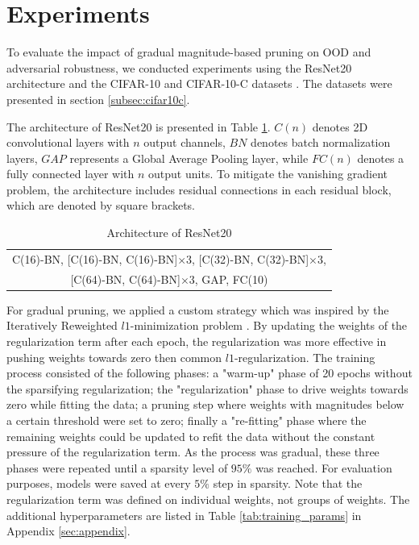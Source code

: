 \section{Experiments}\label{sec:exp}

To evaluate the impact of gradual magnitude-based pruning on OOD and adversarial robustness, we conducted experiments using the
ResNet20 architecture and the CIFAR-10 and CIFAR-10-C datasets \cite{resnet}. The datasets were presented in section \ref{subsec:cifar10c}.

The architecture of ResNet20 is presented in Table \ref{tab:resnet20}. $C(n)$ denotes 2D convolutional layers with $n$ output channels, $BN$ denotes
batch normalization layers, $GAP$ represents a Global Average Pooling layer, while $FC(n)$ denotes a fully connected layer with $n$ output units. 
To mitigate the vanishing gradient problem, the architecture includes residual connections in each residual block, which are denoted by square brackets.

\begin{table}[H]
\centering
\begin{tabular}{|c|}
    \hline
    C(16)-BN, [C(16)-BN, C(16)-BN]$\times3$, [C(32)-BN, C(32)-BN]$\times3$, \\ {}
    [C(64)-BN, C(64)-BN]$\times3$, GAP, FC(10) \\ \hline
\end{tabular}
\caption{Architecture of ResNet20}
\label{tab:resnet20}
\end{table}

For gradual pruning, we applied a custom strategy which was inspired by the Iteratively Reweighted $l1$-minimization problem \cite{boyd}. By updating 
the weights of the regularization term after each epoch, the regularization was more effective in pushing weights towards zero then common 
$l1$-regularization. The training process consisted of the following phases: a "warm-up" phase of 20 epochs without the sparsifying regularization; 
the "regularization" phase to drive weights towards zero while fitting the data; a pruning step where weights with magnitudes below a certain threshold
were set to zero; finally a "re-fitting" phase where the remaining weights could be updated to refit the data without the constant pressure of 
the regularization term. As the process was gradual, these three phases were repeated until a sparsity level of $95\%$ was reached. For evaluation purposes, 
models were saved at every $5\%$ step in sparsity. Note that the regularization term was defined on individual weights, not groups of weights.
The additional hyperparameters are listed in Table \ref{tab:training_params} in Appendix \ref{sec:appendix}.


